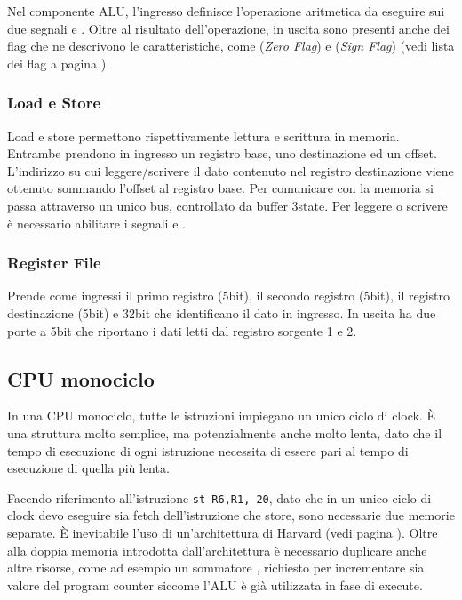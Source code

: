 \documentclass[../ace.tex]{subfiles}
\begin{document}
Nel componente ALU, l'ingresso  definisce l'operazione aritmetica da eseguire sui due segnali  e .
Oltre al risultato dell'operazione, in uscita sono presenti anche dei flag che ne descrivono le caratteristiche, come  (\textit{Zero Flag}) e  (\textit{Sign Flag})  (vedi lista dei flag a pagina \pageref{8086_flags}).

\subsubsection{Load e Store}
Load e store permettono rispettivamente lettura e scrittura in memoria.
Entrambe prendono in ingresso un registro base, uno destinazione ed un offset.
L'indirizzo su cui leggere/scrivere il dato contenuto nel registro destinazione viene ottenuto sommando l'offset al registro base.
Per comunicare con la memoria si passa attraverso un unico bus, controllato da buffer 3state. Per leggere o scrivere è necessario abilitare i segnali
 e .

\subsubsection{Register File}
Prende come ingressi il primo registro (5bit), il secondo registro (5bit), il registro destinazione (5bit) e 32bit che identificano il dato in ingresso.
In uscita ha due porte a 5bit che riportano i dati letti dal registro sorgente 1 e 2.

\def\tmono{T_\text{mono}}
\def\tmulti{T_\text{multi}}
\subsection{CPU monociclo}
In una CPU monociclo, tutte le istruzioni impiegano un unico ciclo di clock. È una struttura molto semplice, ma potenzialmente anche molto
lenta, dato che il tempo di esecuzione di ogni istruzione necessita di essere pari al tempo di esecuzione di quella più lenta.

Facendo riferimento all'istruzione \lstinline{st R6,R1, 20},
dato che in un unico ciclo di clock devo eseguire sia fetch dell'istruzione che store, sono necessarie due memorie separate.
È inevitabile l'uso di un'architettura di Harvard (vedi pagina \pageref{sec:architettura_harvard}).
Oltre alla doppia memoria introdotta dall'architettura è necessario duplicare anche altre risorse, come ad esempio un sommatore , richiesto per incrementare sia valore del program counter siccome l'ALU è già utilizzata in fase di execute.
\end{document}
